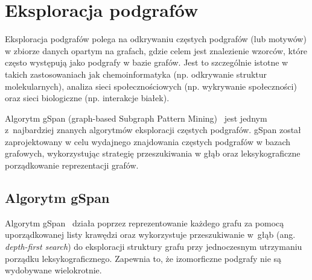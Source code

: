 \begin{algorithm}[!htb]
\LinesNumbered
{}

\BlankLine


\caption{\textbf{SPADE} algorithm (Sequential PAttern Discovery using Equivalence classes)}
\label{alg:spade}
\end{algorithm}


\section{Eksploracja podgrafów}
\label{sec:subgraph}
Eksploracja podgrafów polega na odkrywaniu częstych podgrafów (lub motywów) w zbiorze danych opartym na grafach, gdzie celem jest znalezienie wzorców, które często występują jako podgrafy w bazie grafów. Jest to szczególnie istotne w takich zastosowaniach jak chemoinformatyka (np. odkrywanie struktur molekularnych), analiza sieci społecznościowych (np. wykrywanie społeczności) oraz sieci biologiczne (np. interakcje białek).

Algorytm gSpan (graph-based Subgraph Pattern Mining)~\cite{yan2002gspan} jest jednym z~najbardziej znanych algorytmów eksploracji częstych podgrafów. gSpan został zaprojektowany w celu wydajnego znajdowania częstych podgrafów w bazach grafowych, wykorzystując strategię przeszukiwania w głąb oraz leksykograficzne porządkowanie reprezentacji grafów.


\subsection{Algorytm gSpan}
Algorytm gSpan~\cite{yan2002gspan} działa poprzez reprezentowanie każdego grafu za pomocą uporządkowanej listy krawędzi oraz wykorzystuje przeszukiwanie w~głąb (ang. \textit{depth-first search}) do eksploracji struktury grafu przy jednoczesnym utrzymaniu porządku leksykograficznego. Zapewnia to, że izomorficzne podgrafy nie są wydobywane wielokrotnie.

